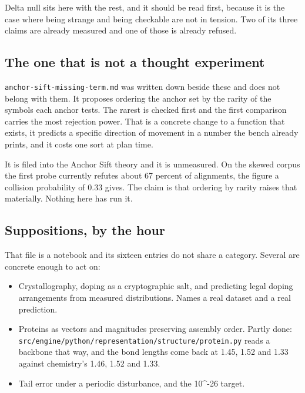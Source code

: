 Delta null sits here with the rest, and it should be read first, because it is the case where being strange and being checkable are not in tension. Two of its three claims are already measured and one of those is already refused.

\subsection{The one that is not a thought experiment}

\texttt{anchor-\allowbreak{}sift-\allowbreak{}missing-\allowbreak{}term.\allowbreak{}md} was written down beside these and does not belong with them. It proposes ordering the anchor set by the rarity of the symbols each anchor tests. The rarest is checked first and the first comparison carries the most rejection power. That is a concrete change to a function that exists, it predicts a specific direction of movement in a number the bench already prints, and it costs one sort at plan time.

It is filed into the Anchor Sift theory and it is unmeasured. On the skewed corpus the first probe currently refutes about 67 percent of alignments, the figure a collision probability of 0.33 gives. The claim is that ordering by rarity raises that materially. Nothing here has run it.

\subsection{Suppositions, by the hour}

That file is a notebook and its sixteen entries do not share a category. Several are concrete enough to act on:

\begin{itemize}
\item Crystallography, doping as a cryptographic salt, and predicting legal doping arrangements from measured distributions. Names a real dataset and a real prediction.
\item Proteins as vectors and magnitudes preserving assembly order. Partly done: \texttt{src/\allowbreak{}engine/\allowbreak{}python/\allowbreak{}representation/\allowbreak{}structure/\allowbreak{}protein.\allowbreak{}py} reads a backbone that way, and the bond lengths come back at 1.45, 1.52 and 1.33 against chemistry's 1.46, 1.52 and 1.33.
\item Tail error under a periodic disturbance, and the 10\textasciicircum{}-26 target.
\end{itemize}

